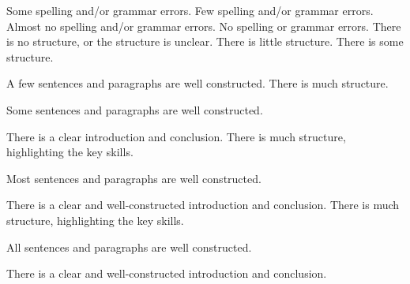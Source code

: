 \documentclass{../fal_assignment}
\begin{document}
\begin{markingrubric}
        \grade 		Some spelling and/or grammar errors.  
        \grade 		Few spelling and/or grammar errors.
        \grade 		Almost no spelling and/or grammar errors.
        \grade 		No spelling or grammar errors.
%
        \grade\fail 	There is no structure, or the structure is unclear.
        \grade 		There is little structure.
        \grade 		There is some structure.
        \par 		A few sentences and paragraphs are well constructed.
        \grade 		There is much structure.
        \par 		Some sentences and paragraphs are well constructed.
        \par 		There is a clear introduction and conclusion.
        \grade 		There is much structure, highlighting the key skills.
        \par 		Most sentences and paragraphs are well constructed.
        \par 		There is a clear and well-constructed introduction and conclusion.
        \grade 		There is much structure, highlighting the key skills.
        \par 		All sentences and paragraphs are well constructed.
        \par 		There is a clear and well-constructed introduction and conclusion.
\end{markingrubric}
\end{document}
